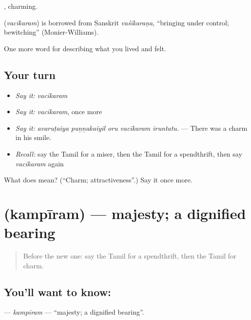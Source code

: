 , charming.

\begin{cousinweb}
\textbf{} (\emph{vacīkaram}) is borrowed from Sanskrit \emph{vaśīkaraṇa}, \textquotedblleft{}bringing under control; bewitching\textquotedblright{} (Monier-Williams).
\end{cousinweb}

\begin{grammarlens}[title={What you've built}]
One more word for describing what you lived and felt.
\end{grammarlens}

\subsection*{Your turn}
\begin{itemize}
\raggedright
  \item \emph{Say it:} \emph{vacīkaram}
  \item \emph{Say it:} \emph{vacīkaram}, once more
  \item \emph{Say it:} \emph{avaruṭaiya puṉṉakaiyil oru vacīkaram iruntatu.} — There was a charm in his smile.
  \item \emph{Recall:} say the Tamil for a miser, then the Tamil for a spendthrift, then say \emph{vacīkaram} again
\end{itemize}

\begin{tcolorbox}[breakable,colback=teal!4,colframe=teal!35!black,title={Before you move on}]
What does  mean? (\textquotedblleft{}Charm; attractiveness\textquotedblright{}.) Say it once more.
\end{tcolorbox}
\section[\texorpdfstring{\ta{கம்பீரம்} (kampīram)}{கம்பீரம் (kampīram)}]{ (kampīram) — majesty; a dignified bearing}

\label{lesson:TA-C473-kampiram}



\begin{quote}
Before the new one: say the Tamil for a spendthrift, then the Tamil for charm.
\end{quote}

\subsection*{You'll want to know: }
\textbf{} — \emph{kampīram} — \textquotedblleft{}majesty; a dignified bearing\textquotedblright{}.

